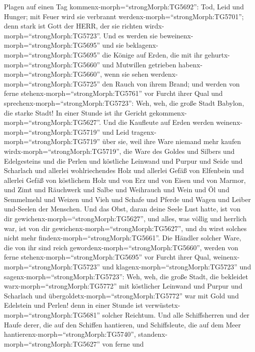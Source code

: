 Plagen auf einen Tag kommenx-morph=``strongMorph:TG5692'': Tod, Leid und
Hunger; mit Feuer wird sie verbrannt
werdenx-morph=``strongMorph:TG5701''; denn stark ist Gott der HERR, der
sie richten wirdx-morph=``strongMorph:TG5723''.  Und es
werden sie beweinenx-morph=``strongMorph:TG5695'' und sie
beklagenx-morph=``strongMorph:TG5695'' die Könige auf Erden, die mit ihr
gehurtx-morph=``strongMorph:TG5660'' und Mutwillen getrieben
habenx-morph=``strongMorph:TG5660'', wenn sie sehen
werdenx-morph=``strongMorph:TG5725'' den Rauch von ihrem Brand;
 und werden von ferne stehenx-morph=``strongMorph:TG5761''
vor Furcht ihrer Qual und sprechenx-morph=``strongMorph:TG5723'': Weh,
weh, die große Stadt Babylon, die starke Stadt! In einer Stunde ist ihr
Gericht gekommenx-morph=``strongMorph:TG5627''.  Und die
Kaufleute auf Erden werden weinenx-morph=``strongMorph:TG5719'' und Leid
tragenx-morph=``strongMorph:TG5719'' über sie, weil ihre Ware niemand
mehr kaufen wirdx-morph=``strongMorph:TG5719'',  die Ware
des Goldes und Silbers und Edelgesteins und die Perlen und köstliche
Leinwand und Purpur und Seide und Scharlach und allerlei wohlriechendes
Holz und allerlei Gefäß von Elfenbein und allerlei Gefäß von köstlichem
Holz und von Erz und von Eisen und von Marmor,  und Zimt
und Räuchwerk und Salbe und Weihrauch und Wein und Öl und Semmelmehl und
Weizen und Vieh und Schafe und Pferde und Wagen und Leiber und-Seelen
der Menschen.  Und das Obst, daran deine Seele Lust hatte,
ist von dir gewichenx-morph=``strongMorph:TG5627'', und alles, was
völlig und herrlich war, ist von dir
gewichenx-morph=``strongMorph:TG5627'', und du wirst solches nicht mehr
findenx-morph=``strongMorph:TG5661''.  Die Händler solcher
Ware, die von ihr sind reich gewordenx-morph=``strongMorph:TG5660'',
werden von ferne stehenx-morph=``strongMorph:TG5695'' vor Furcht ihrer
Qual, weinenx-morph=``strongMorph:TG5723'' und
klagenx-morph=``strongMorph:TG5723''  und
sagenx-morph=``strongMorph:TG5723'': Weh, weh, die große Stadt, die
bekleidet warx-morph=``strongMorph:TG5772'' mit köstlicher Leinwand und
Purpur und Scharlach und übergoldetx-morph=``strongMorph:TG5772'' war
mit Gold und Edelstein und Perlen!  denn in einer Stunde
ist verwüstetx-morph=``strongMorph:TG5681'' solcher Reichtum. Und alle
Schiffsherren und der Haufe derer, die auf den Schiffen hantieren, und
Schiffsleute, die auf dem Meer hantierenx-morph=``strongMorph:TG5740'',
standenx-morph=``strongMorph:TG5627'' von ferne  und
